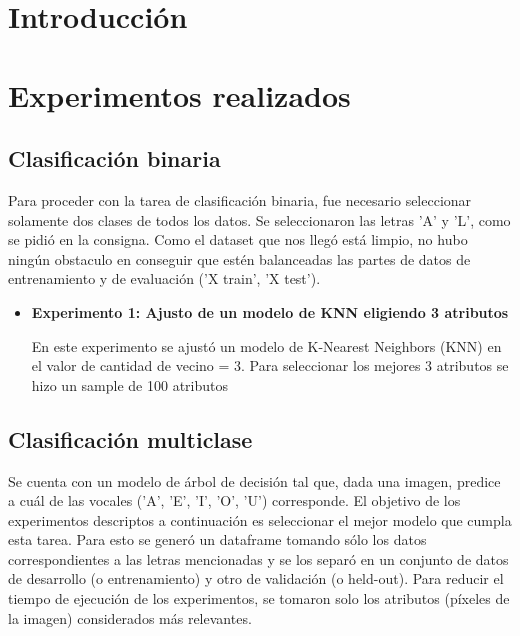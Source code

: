 \documentclass[11pt,a4paper, twocolumn]{article}
\begin{document}

\fecha{\today}


\onecolumn

\maketitle


\section{Introducción}
\section{Experimentos realizados}
\subsection{Clasificación binaria}
Para proceder con la tarea de clasificación binaria, fue necesario seleccionar solamente dos clases de todos los datos. Se seleccionaron las letras 'A' y 'L', como se pidió en la consigna.
Como el dataset que nos llegó está limpio, no hubo ningún obstaculo en conseguir que estén balanceadas las partes de datos de entrenamiento y de evaluación ('X train', 'X test'). 
\begin{itemize}
    \item[]
       \textbf{Experimento 1: Ajusto de un modelo de KNN eligiendo 3 atributos}

En este experimento se ajustó un modelo de K-Nearest Neighbors (KNN) en el valor de cantidad de vecino = 3. 
Para seleccionar los mejores 3 atributos se hizo un sample de 100 atributos 
\end{itemize}

\subsection{Clasificación multiclase}
Se cuenta con un modelo de árbol de decisión tal que, dada una imagen, predice a cuál de las vocales ('A', 'E', 'I', 'O', 'U') corresponde. El objetivo de los experimentos descriptos a continuación es seleccionar el mejor modelo que cumpla esta tarea. Para esto se generó un dataframe tomando sólo los datos correspondientes a las letras mencionadas y se los separó en un conjunto de datos de desarrollo (o entrenamiento) y otro de validación (o held-out). Para reducir el tiempo de ejecución de los experimentos, se tomaron solo los atributos (píxeles de la imagen) considerados más relevantes.
\end{document}
